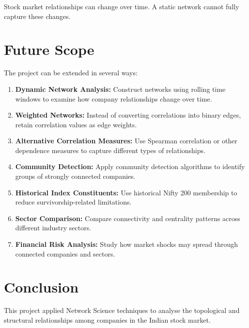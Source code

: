 \documentclass[11pt,a4paper]{article}
\begin{document}
Stock market relationships can change over time.
A static network cannot fully capture these
changes.

\section{Future Scope}

The project can be extended in several ways:

\begin{enumerate}
    \item \textbf{Dynamic Network Analysis:}
    Construct networks using rolling time windows
    to examine how company relationships change
    over time.

    \item \textbf{Weighted Networks:}
    Instead of converting correlations into binary
    edges, retain correlation values as edge weights.

    \item \textbf{Alternative Correlation Measures:}
    Use Spearman correlation or other dependence
    measures to capture different types of relationships.

    \item \textbf{Community Detection:}
    Apply community detection algorithms to identify
    groups of strongly connected companies.

    \item \textbf{Historical Index Constituents:}
    Use historical Nifty 200 membership to reduce
    survivorship-related limitations.

    \item \textbf{Sector Comparison:}
    Compare connectivity and centrality patterns
    across different industry sectors.

    \item \textbf{Financial Risk Analysis:}
    Study how market shocks may spread through
    connected companies and sectors.
\end{enumerate}

\section{Conclusion}

This project applied Network Science techniques
to analyse the topological and structural
relationships among companies in the Indian
stock market.
\end{document}
